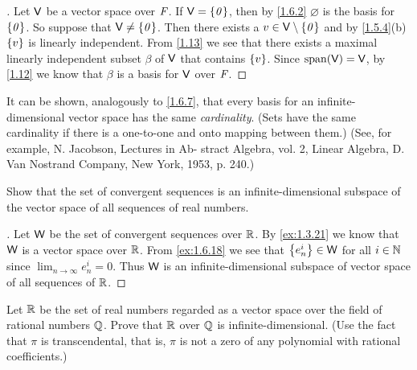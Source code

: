 \begin{proof}[]
  Let \(\mathsf{V}\) be a vector space over \(\mathit{F}\).
  If \(\mathsf{V} = \left\lbrace\mathit{0}\right\rbrace\), then by \cref{1.6.2} \(\varnothing\) is the basis for \(\left\lbrace\mathit{0}\right\rbrace\).
  So suppose that \(\mathsf{V} \neq \left\lbrace\mathit{0}\right\rbrace\).
  Then there exists a \(v \in \mathsf{V} \setminus \left\lbrace\mathit{0}\right\rbrace\) and by \cref{1.5.4}(b) \(\left\lbrace v\right\rbrace\) is linearly independent.
  From \cref{1.13} we see that there exists a maximal linearly independent subset \(\beta\) of \(\mathsf{V}\) that contains \(\left\lbrace v\right\rbrace\).
  Since \(\spn{\V} = \V\), by \cref{1.12} we know that \(\beta\) is a basis for \(\mathsf{V}\) over \(\mathit{F}\).
\end{proof}

\begin{note}
  It can be shown, analogously to \cref{1.6.7}, that every basis for an infinite-dimensional vector space has the same \emph{cardinality}.
  (Sets have the same cardinality if there is a one-to-one and onto mapping between them.)
  (See, for example, N. Jacobson, Lectures in Ab- stract Algebra, vol. 2, Linear Algebra, D. Van Nostrand Company, New York, 1953, p. 240.)
\end{note}

\exercisesection

\setcounter{ex}{1}
\begin{ex}\label{ex:1.7.2}
  Show that the set of convergent sequences is an infinite-dimensional subspace of the vector space of all sequences of real numbers.
\end{ex}

\begin{proof}[]
  Let \(\mathsf{W}\) be the set of convergent sequences over \(\mathbb{R}\).
  By \cref{ex:1.3.21} we know that \(\mathsf{W}\) is a vector space over \(\mathbb{R}\).
  From \cref{ex:1.6.18} we see that \(\left\lbrace e_n^i\right\rbrace \in \mathsf{W}\) for all \(i \in \mathbb{N}\) since \(\lim_{n \to \infty} e_n^i = 0\).
  Thus \(\mathsf{W}\) is an infinite-dimensional subspace of vector space of all sequences of \(\mathbb{R}\).
\end{proof}

\begin{ex}\label{ex:1.7.3}
  Let \(\mathbb{R}\) be the set of real numbers regarded as a vector space over the field of rational numbers \(\mathbb{Q}\).
  Prove that \(\mathbb{R}\) over \(\mathbb{Q}\) is infinite-dimensional.
  (Use the fact that \(\pi\) is transcendental, that is, \(\pi\) is not a zero of any polynomial with rational coefficients.)
\end{ex}

